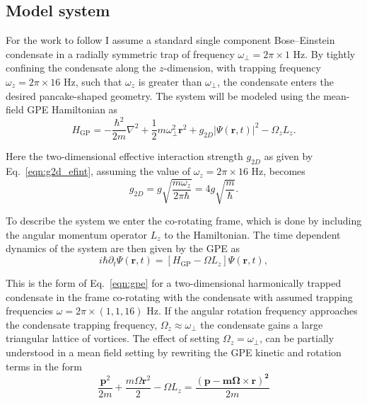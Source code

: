 \subsection{Model system}\label{sec:modelsystem}

For the work to follow I assume a standard single component Bose--Einstein condensate in a radially symmetric trap of frequency $\omega_\perp = 2\pi \times 1$ Hz. By tightly confining the condensate along the $z$-dimension, with trapping frequency $\omega_z = 2\pi\times 16$ Hz, such that $\omega_z $ is greater than $ \omega_\perp$, the condensate enters the desired pancake-shaped geometry. The system will be modeled using the mean-field GPE Hamiltonian as
\begin{equation}\label{eqn:gpe_h0}
	H_{\mathrm{GP}} = -\frac{\hbar^2}{2m}\nabla^2 + \frac{1}{2}m\omega_{\perp}^2\mathbf{r}^2 + g_{2D}\vert\Psi(\mathbf{r},t)\vert^2 - \Omega_z L_z.
\end{equation}

Here the two-dimensional effective interaction strength $g_{2D}$ as given by Eq.~\eqref{eqn:g2d_efint}, assuming the value of $\omega_z=2\pi\times 16$ Hz, becomes
\begin{equation}
g_{2D} = g\sqrt{\frac{m\omega_z}{2\pi\hbar}} = 4g \sqrt{\frac{m}{\hbar}}.
\end{equation}

To describe the system we enter the co-rotating frame, which is done by including the angular momentum operator $L_z$ to the Hamiltonian. The time dependent dynamics of the system are then given by the GPE as
\begin{equation}\label{eqn:gpe2d_}
	i\hbar\partial_t\Psi(\mathbf{r},t) = \left[ H_{\text{GP}}  -  \Omega L_z \right] \Psi(\mathbf{r},t),
\end{equation}

This is the form of Eq.~\eqref{eqn:gpe} for a two-dimensional harmonically trapped condensate in the frame co-rotating with the condensate with assumed trapping frequencies $\omega=2\pi\times (1,1,16)$ Hz. If the angular rotation frequency approaches the condensate trapping frequency, $\Omega_z \approx \omega_\perp$ the condensate gains a large triangular lattice of vortices.  The effect of setting $\Omega_z=\omega_\perp$, can be partially understood in a mean field setting by rewriting the GPE kinetic and rotation terms in the form
\begin{equation}
    \frac{\mathbf{p}^2}{2m} + \frac{m\Omega\mathbf{r}^2}{2} - \Omega L_z = \frac{\mathbf{\left(p -m\boldsymbol{\Omega}\times\mathbf{r}\right)^2}}{2m}
\end{equation}

